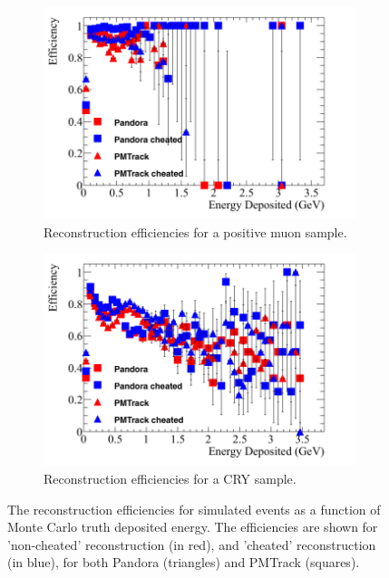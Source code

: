 \begin{figure}[h!]
  \centering
  \begin{subfigure}{0.48\textwidth}
    \centering
    \includegraphics[width=\textwidth]{Effic_AntiMuon_500V_All_EnDepos}
    \caption{Reconstruction efficiencies for a positive muon sample.}
    \label{fig:SimEffic_EnDepos_AMu}
  \end{subfigure}%
  \hspace{0.03\textwidth}%
  \begin{subfigure}{0.48\textwidth}
    \centering
    \includegraphics[width=\textwidth]{Effic_Cosmics_500V_All_EnDepos}
    \caption{Reconstruction efficiencies for a CRY sample.}
    \label{fig:SimEffic_EnDepos_CRY}
  \end{subfigure}
  \caption[The reconstruction efficiencies for simulated events as a function of Monte Carlo truth deposited energy.]
          {The reconstruction efficiencies for simulated events as a function of Monte Carlo truth deposited energy. The efficiencies are shown for 'non-cheated' reconstruction (in red), and 'cheated' reconstruction (in blue), for both Pandora (triangles) and PMTrack (squares).}
          \label{fig:SimEffic_EnDepos}
\end{figure}

